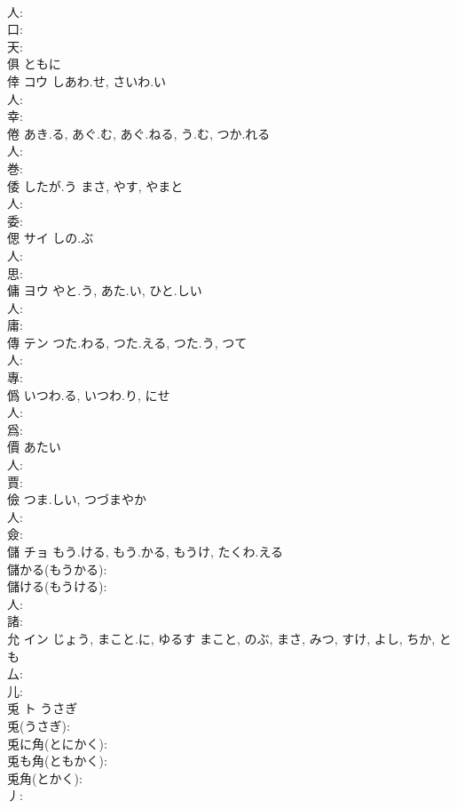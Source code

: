 \documentclass[8pt]{extreport}
\begin{document}
\begin{CJK}{UTF8}{min}
\\	人: 
\\	口: 
\\	天: 
\\	俱		ともに				
\\	倖	コウ	しあわ.せ, さいわ.い		
\\	人: 
\\	幸: 
\\	倦		あき.る, あぐ.む, あぐ.ねる, う.む, つか.れる				
\\	人: 
\\	巻: 
\\	倭		したが.う	まさ, やす, やまと			
\\	人: 
\\	委: 
\\	偲	サイ	しの.ぶ		
\\	人: 
\\	思: 
\\	傭	ヨウ	やと.う, あた.い, ひと.しい		
\\	人: 
\\	庸: 
\\	傳	テン	つた.わる, つた.える, つた.う, つて				
\\	人: 
\\	專: 
\\	僞		いつわ.る, いつわ.り, にせ				
\\	人: 
\\	爲: 
\\	價		あたい				
\\	人: 
\\	賈: 
\\	儉		つま.しい, つづまやか				
\\	人: 
\\	僉: 
\\	儲	チョ	もう.ける, もう.かる, もうけ, たくわ.える		
\\	儲かる(もうかる): 
\\	儲ける(もうける): 
\\	人: 
\\	諸: 
\\	允	イン	じょう, まこと.に, ゆるす	まこと, のぶ, まさ, みつ, すけ, よし, ちか, とも	
\\	厶: 
\\	儿: 
\\	兎	ト	うさぎ		
\\	兎(うさぎ): 
\\	兎に角(とにかく): 
\\	兎も角(ともかく): 
\\	兎角(とかく): 
\\	丿: 

\end{CJK}
\end{document}
